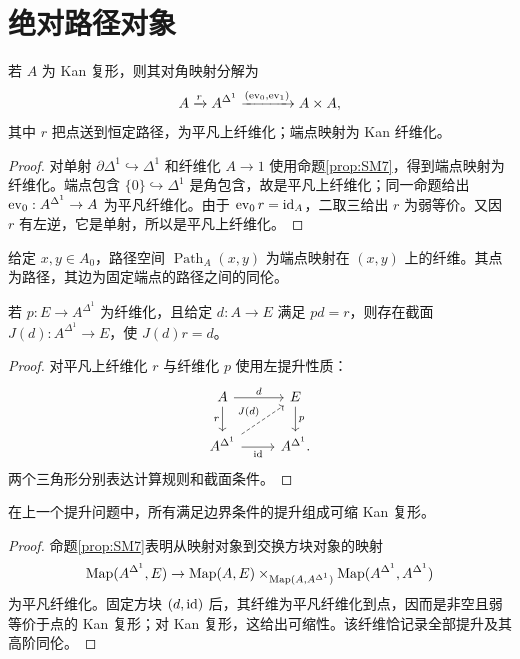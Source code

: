\section{绝对路径对象}
\begin{proposition}[路径对象分解]
若 $A$ 为 Kan 复形，则其对角映射分解为
\[
A\xrightarrow{r}A^{\Delta^1}
\xrightarrow{(\operatorname{ev}_0,\operatorname{ev}_1)}A\times A,
\]
其中 $r$ 把点送到恒定路径，为平凡上纤维化；端点映射为 Kan 纤维化。
\end{proposition}
\begin{proof}
对单射 $\partial\Delta^1\hookrightarrow\Delta^1$ 和纤维化 $A\to1$ 使用命题\ref{prop:SM7}，得到端点映射为纤维化。端点包含 $\{0\}\hookrightarrow\Delta^1$ 是角包含，故是平凡上纤维化；同一命题给出 $\operatorname{ev}_0:A^{\Delta^1}\to A$ 为平凡纤维化。由于 $\operatorname{ev}_0r=\operatorname{id}_A$，二取三给出 $r$ 为弱等价。又因 $r$ 有左逆，它是单射，所以是平凡上纤维化。
\end{proof}
\begin{definition}[路径纤维]
给定 $x,y\in A_0$，路径空间 $\operatorname{Path}_A(x,y)$ 为端点映射在 $(x,y)$ 上的纤维。其点为路径，其边为固定端点的路径之间的同伦。
\end{definition}
\begin{proposition}[从恒定路径延拓]
若 $p:E\to A^{\Delta^1}$ 为纤维化，且给定 $d:A\to E$ 满足 $pd=r$，则存在截面 $J(d):A^{\Delta^1}\to E$，使 $J(d)r=d$。
\end{proposition}
\begin{proof}
对平凡上纤维化 $r$ 与纤维化 $p$ 使用左提升性质：
\[
\begin{tikzcd}
A\ar[r,"d"]\ar[d,"r"']&E\ar[d,"p"]\\
A^{\Delta^1}\ar[r,"\id"']\ar[ur,dashed,"J(d)"]&A^{\Delta^1}.
\end{tikzcd}
\]
两个三角形分别表达计算规则和截面条件。
\end{proof}
\begin{proposition}[延拓空间的可缩性]
在上一个提升问题中，所有满足边界条件的提升组成可缩 Kan 复形。
\end{proposition}
\begin{proof}
命题\ref{prop:SM7}表明从映射对象到交换方块对象的映射
\[
\operatorname{Map}(A^{\Delta^1},E)\to
\operatorname{Map}(A,E)\times_{\operatorname{Map}(A,A^{\Delta^1})}
\operatorname{Map}(A^{\Delta^1},A^{\Delta^1})
\]
为平凡纤维化。固定方块 $(d,\operatorname{id})$ 后，其纤维为平凡纤维化到点，因而是非空且弱等价于点的 Kan 复形；对 Kan 复形，这给出可缩性。该纤维恰记录全部提升及其高阶同伦。
\end{proof}

